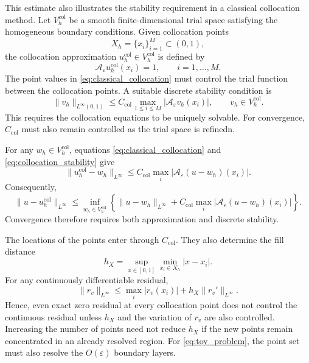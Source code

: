 \documentclass[11pt, onecolumn]{report}
\begin{document}
This estimate also illustrates the stability requirement in a classical collocation method. Let \(V_h^{\mathrm{col}}\) be a smooth finite-dimensional trial space satisfying the homogeneous boundary conditions. Given collocation points
\begin{equation*}
    X_h=\{x_i\}_{i=1}^{M}\subset(0,1),
\end{equation*}
the collocation approximation \(u_h^{\mathrm{col}}\in V_h^{\mathrm{col}}\) is defined by
\begin{equation}
    \mathcal A_\varepsilon u_h^{\mathrm{col}}(x_i)=1,
    \qquad i=1,\ldots,M.
    \label{eq:classical_collocation}
\end{equation}
The point values in \eqref{eq:classical_collocation} must control the trial function between the collocation points. A suitable discrete stability condition is
\begin{equation}
    \|v_h\|_{L^\infty(0,1)}
    \leq
    C_{\mathrm{col}}
    \max_{1\leq i\leq M}
    |\mathcal A_\varepsilon v_h(x_i)|,
    \qquad
    v_h\in V_h^{\mathrm{col}}.
    \label{eq:collocation_stability}
\end{equation}
This requires the collocation equations to be uniquely solvable. For convergence, \(C_{\mathrm{col}}\) must also remain controlled as the trial space is refinedn.

For any \(w_h\in V_h^{\mathrm{col}}\), equations
\eqref{eq:classical_collocation} and \eqref{eq:collocation_stability} give
\begin{equation*}
    \|u_h^{\mathrm{col}}-w_h\|_{L^\infty}
    \leq
    C_{\mathrm{col}}
    \max_i
    |\mathcal A_\varepsilon(u-w_h)(x_i)|.
\end{equation*}
Consequently,
\begin{equation}
    \|u-u_h^{\mathrm{col}}\|_{L^\infty}
    \leq
    \inf_{w_h\in V_h^{\mathrm{col}}}
    \left\{
        \|u-w_h\|_{L^\infty}
        +
        C_{\mathrm{col}}
        \max_i
        |\mathcal A_\varepsilon(u-w_h)(x_i)|
    \right\}.
    \label{eq:collocation_error_estimate}
\end{equation}
Convergence therefore requires both approximation and discrete stability.

The locations of the points enter through \(C_{\mathrm{col}}\). They also determine the fill distance
\begin{equation*}
    h_{X}
    =
    \sup_{x\in[0,1]}
    \min_{x_i\in X_h}|x-x_i|.
\end{equation*}
For any continuously differentiable residual,
\begin{equation*}
    \|r_v\|_{L^\infty}
    \leq
    \max_i|r_v(x_i)|
    +
    h_X\|r_v'\|_{L^\infty}.
\end{equation*}
Hence, even exact zero residual at every collocation point does not control the continuous residual unless \(h_X\) and the variation of \(r_v\) are also controlled. Increasing the number of points need not reduce \(h_X\) if the new points remain concentrated in an already resolved region. For \eqref{eq:toy_problem}, the point set must also resolve the \(O(\varepsilon)\) boundary layers.
\end{document}
